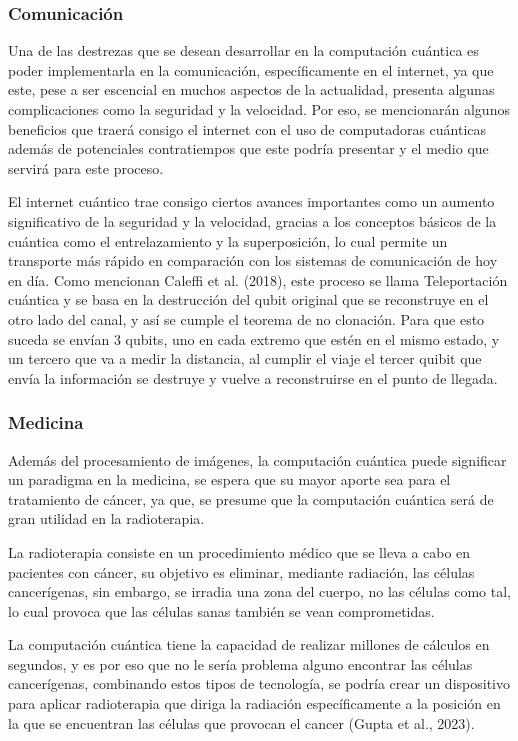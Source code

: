 \documentclass[twoside]{article}
\begin{document}
\subsubsection{Comunicación}
Una de las destrezas que se desean desarrollar en la computación cuántica es poder implementarla en la comunicación, específicamente en el internet, ya que este, pese a ser escencial en muchos aspectos de la actualidad, presenta algunas complicaciones como la seguridad y la velocidad. Por eso, se mencionarán algunos beneficios que traerá consigo el internet con el uso de computadoras cuánticas además de potenciales contratiempos que este podría presentar y el medio que servirá para este proceso.

El internet cuántico trae consigo ciertos avances importantes como un aumento significativo de la seguridad y la velocidad, gracias a los conceptos básicos de la cuántica como el entrelazamiento y la superposición, lo cual permite un transporte más rápido en comparación con los sistemas de comunicación de hoy en día. Como mencionan Caleffi et al. (2018), este proceso se llama Teleportación cuántica y se basa en la destrucción del qubit original que se reconstruye en el otro lado del canal, y así se cumple el teorema de no clonación. Para que esto suceda se envían 3 qubits, uno en cada extremo que estén en el mismo estado, y un tercero que va a medir la distancia, al cumplir el viaje el tercer quibit que envía la información se destruye y vuelve a reconstruirse en el punto de llegada. 

\subsubsection{Medicina}
Además del procesamiento de imágenes, la computación cuántica puede significar un paradigma en la medicina, se espera que su mayor aporte sea para el tratamiento de cáncer, ya que, se presume que la computación cuántica será de gran utilidad en la radioterapia.

La radioterapia consiste en un procedimiento médico que se lleva a cabo en pacientes con cáncer, su objetivo es eliminar, mediante radiación, las células cancerígenas, sin embargo, se irradia una zona del cuerpo, no las células como tal, lo cual provoca que las células sanas también se vean comprometidas. 

La computación cuántica tiene la capacidad de realizar millones de cálculos en segundos, y es por eso que no le sería problema alguno encontrar las células cancerígenas, combinando estos tipos de tecnología, se podría crear un dispositivo para aplicar radioterapia que diriga la radiación específicamente a la posición en la que se encuentran las células que provocan el cancer (Gupta et al., 2023).
\end{document}
